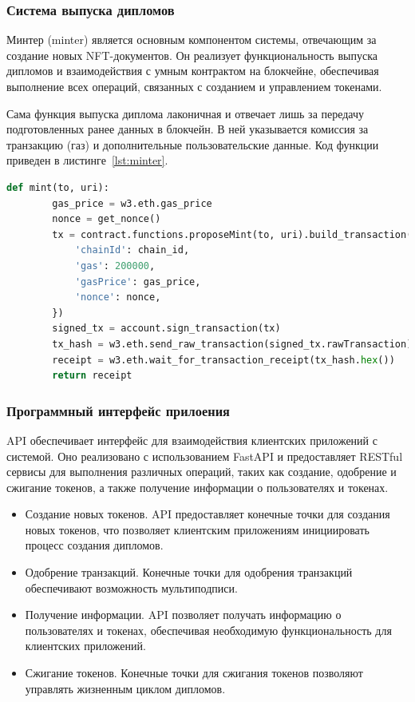 \subsubsection{Система выпуска дипломов}

Минтер (minter) является основным компонентом системы, отвечающим за создание новых NFT-документов. Он реализует функциональность выпуска дипломов и взаимодействия с умным контрактом на блокчейне, обеспечивая выполнение всех операций, связанных с созданием и управлением токенами.

Сама функция выпуска диплома лаконичная и отвечает лишь за передачу подготовленных ранее данных в блокчейн. В ней указывается комиссия за транзакцию (газ) и дополнительные пользовательские данные. Код функции приведен в листинге~\ref{lst:minter}.

\begin{lstlisting}[label=lst:minter, language=Python, caption=Функция выпуска диплома]
    def mint(to, uri):
        gas_price = w3.eth.gas_price
        nonce = get_nonce()
        tx = contract.functions.proposeMint(to, uri).build_transaction({
            'chainId': chain_id,
            'gas': 200000,
            'gasPrice': gas_price,
            'nonce': nonce,
        })
        signed_tx = account.sign_transaction(tx)
        tx_hash = w3.eth.send_raw_transaction(signed_tx.rawTransaction)
        receipt = w3.eth.wait_for_transaction_receipt(tx_hash.hex())
        return receipt
\end{lstlisting}

\subsubsection{Программный интерфейс прилоения}

API обеспечивает интерфейс для взаимодействия клиентских приложений с системой. Оно реализовано с использованием FastAPI и предоставляет RESTful сервисы для выполнения различных операций, таких как создание, одобрение и сжигание токенов, а также получение информации о пользователях и токенах.

\begin{itemize}
    \item Создание новых токенов. API предоставляет конечные точки для создания новых токенов, что позволяет клиентским приложениям инициировать процесс создания дипломов.
    \item Одобрение транзакций. Конечные точки для одобрения транзакций обеспечивают возможность мультиподписи.
    \item Получение информации. API позволяет получать информацию о пользователях и токенах, обеспечивая необходимую функциональность для клиентских приложений.
    \item Сжигание токенов. Конечные точки для сжигания токенов позволяют управлять жизненным циклом дипломов.
\end{itemize}

